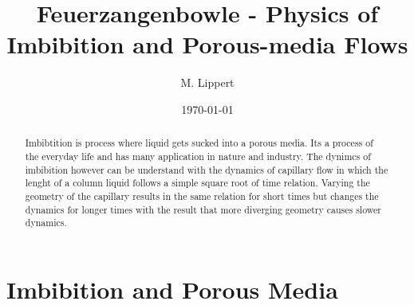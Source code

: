 \documentclass[aip, amsmath, amssymb, reprint, twocolumn, floatfix]{revtex4-1}
\begin{document}

\title[Feuerzangenbowle - Physics of Imbibition and Porous-media Flows]
{Feuerzangenbowle - Physics of Imbibition and Porous-media Flows}

\author{M. Lippert}

\date{\today}


\begin{abstract}
    Imbibtition is process where liquid gets sucked into a porous media. Its a process of the everyday life and has many application in nature and industry. The dynimcs of imbibition however can be understand with the dynamics of capillary flow in which the lenght of a column liquid follows a simple square root of time relation. Varying the geometry of the capillary results in the same relation for short times but changes the dynamics for longer times with the result that more diverging geometry causes slower dynamics.
\end{abstract}

\maketitle


\section{Imbibition and Porous Media}
\label{sec:introdction}

\begin{center}
	\captionsetup{type=figure}
	
	\label{fig:porous-cube}
\end{center}
\end{document}
